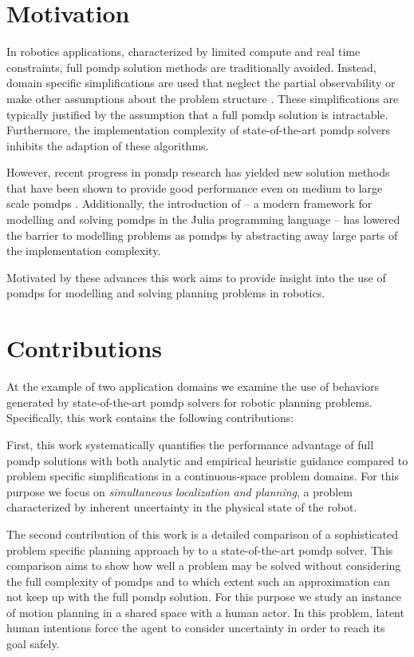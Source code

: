 \section{Motivation}\label{sec:motivation}

In robotics applications, characterized by limited compute and real time
constraints, full \ac{pomdp} solution methods are traditionally avoided.
Instead, domain specific simplifications are used that neglect the partial
observability or make other assumptions about the problem structure
\cite{sadigh2016information, fisac2018probabilistically}. These simplifications
are typically justified by the assumption that a full \ac{pomdp} solution is
intractable. Furthermore, the implementation complexity of state-of-the-art
\ac{pomdp} solvers inhibits the adaption of these algorithms.

However, recent progress in \ac{pomdp} research has yielded new solution methods that
have been shown to provide good performance even on medium to large scale
\acp{pomdp} \cite{somani2013despot,sunberg2018online}. Additionally, the
introduction of \pomdpsjl \cite{egorov2017pomdps} -- a modern framework for
modelling and solving \acp{pomdp} in the Julia programming language -- has
lowered the barrier to modelling problems as \acp{pomdp} by abstracting away
large parts of the implementation complexity.

Motivated by these advances this work aims to provide insight into the use of
\acp{pomdp} for modelling and solving planning problems in robotics.

\section{Contributions}%
\label{sec:contributions}

At the example of two application domains we examine the use of behaviors
generated by state-of-the-art \ac{pomdp} solvers for robotic planning problems.
Specifically, this work contains the following contributions:

First, this work systematically quantifies the performance advantage of full
\ac{pomdp} solutions with both analytic and empirical heuristic guidance
compared to problem specific simplifications in a continuous-space problem
domains. For this purpose we focus on \emph{simultaneous localization and
planning}, a problem characterized by inherent uncertainty in the physical
state of the robot.

The second contribution of this work is a detailed comparison of a
sophisticated problem specific planning approach by
\cite{fisac2018probabilistically} to a state-of-the-art \ac{pomdp} solver. This
comparison aims to show how well a problem may be solved without considering
the full complexity of \acp{pomdp} and to which extent such an approximation
can not keep up with the full \ac{pomdp} solution. For this purpose we study an
instance of motion planning in a shared space with a human actor. In this
problem, latent human intentions force the agent to consider uncertainty in
order to reach its goal safely.

